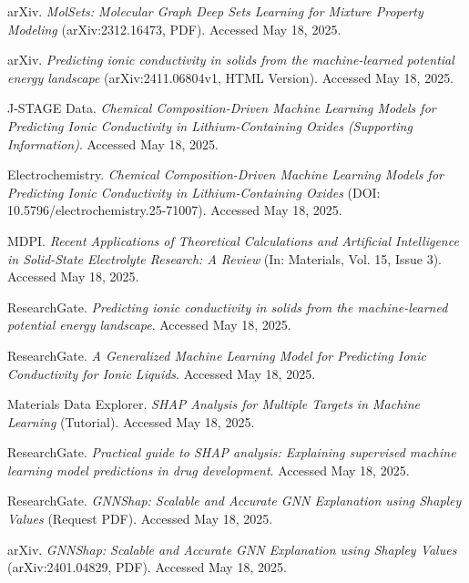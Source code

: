 \documentclass[letterpaper]{article} %
\begin{document}
\begin{thebibliography}{99}
 arXiv. \textit{MolSets: Molecular Graph Deep Sets Learning for Mixture Property Modeling} (arXiv:2312.16473, PDF). Accessed May 18, 2025.

 arXiv. \textit{Predicting ionic conductivity in solids from the machine-learned potential energy landscape} (arXiv:2411.06804v1, HTML Version). Accessed May 18, 2025.

 J-STAGE Data. \textit{Chemical Composition-Driven Machine Learning Models for Predicting Ionic Conductivity in Lithium-Containing Oxides (Supporting Information)}. Accessed May 18, 2025.

 Electrochemistry. \textit{Chemical Composition-Driven Machine Learning Models for Predicting Ionic Conductivity in Lithium-Containing Oxides} (DOI: 10.5796/electrochemistry.25-71007). Accessed May 18, 2025.

 MDPI. \textit{Recent Applications of Theoretical Calculations and Artificial Intelligence in Solid-State Electrolyte Research: A Review} (In: Materials, Vol. 15, Issue 3). Accessed May 18, 2025.

 ResearchGate. \textit{Predicting ionic conductivity in solids from the machine-learned potential energy landscape}. Accessed May 18, 2025.

 ResearchGate. \textit{A Generalized Machine Learning Model for Predicting Ionic Conductivity for Ionic Liquids}. Accessed May 18, 2025.

 Materials Data Explorer. \textit{SHAP Analysis for Multiple Targets in Machine Learning} (Tutorial). Accessed May 18, 2025.

 ResearchGate. \textit{Practical guide to SHAP analysis: Explaining supervised machine learning model predictions in drug development}. Accessed May 18, 2025.

 ResearchGate. \textit{GNNShap: Scalable and Accurate GNN Explanation using Shapley Values} (Request PDF). Accessed May 18, 2025.

 arXiv. \textit{GNNShap: Scalable and Accurate GNN Explanation using Shapley Values} (arXiv:2401.04829, PDF). Accessed May 18, 2025.

\end{thebibliography}



\end{document}
